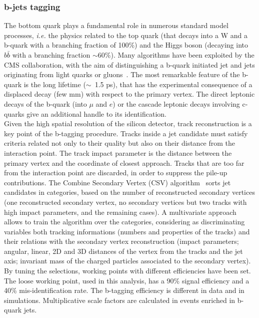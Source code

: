 \subsubsection{b-jets tagging}
\indent The bottom quark plays a fundamental role in numerous standard model processes, \textit{i.e.} the physics related to the top quark (that decays into a W and a b-quark with a branching fraction of 100\%) and the Higgs boson (decaying into $b \bar{b}$ with a branching fraction $\sim$60\%). Many algorithms have been exploited by the CMS collaboration, with the aim of distinguishing a b-quark initiated jet and jets originating from light quarks or gluons~\cite{CMS-PAS-BTV-15-001}. The most remarkable feature of the b-quark is the long lifetime ($\sim$~1.5 ps), that has the experimental consequence of a displaced decay (few mm) with respect to the primary vertex. The direct leptonic decays of the b-quark (into $\mu$ and $e$) or the cascade leptonic decays involving c-quarks give an additional handle to its identification.\\
Given the high spatial resolution of the silicon detector, track reconstruction is a key point of the b-tagging procedure. Tracks inside a jet candidate must satisfy criteria related not only to their quality but also on their distance from the interaction point. The track impact parameter is the distance between the primary vertex and the coordinate of closest approach. Tracks that are too far from the interaction point are discarded, in order to suppress the pile-up contributions. The Combine Secondary Vertex (CSV) algorithm~\cite{Chatrchyan:2012jua} sorts jet candidates in categories, based on the number of reconstructed secondary vertices (one reconstructed secondary vertex, no secondary vertices but two tracks with high impact parameters, and the remaining cases). A multivariate approach allows to train the algorithm over the categories, considering as discriminating variables both tracking informations (numbers and properties of the tracks) and their relations with the secondary vertex reconstruction (impact parameters; angular, linear, 2D and 3D distances of the vertex from the tracks and the jet axis; invariant mass of the charged particles associated to the secondary vertex).\\
By tuning the selections, working points with different efficiencies have been set. The loose working point, used in this analysis, has a 90\% signal efficiency and a 40\% mis-identification rate. The b-tagging efficiency is different in data and in simulations. Multiplicative scale factors are calculated in events enriched in b-quark jets.\\

